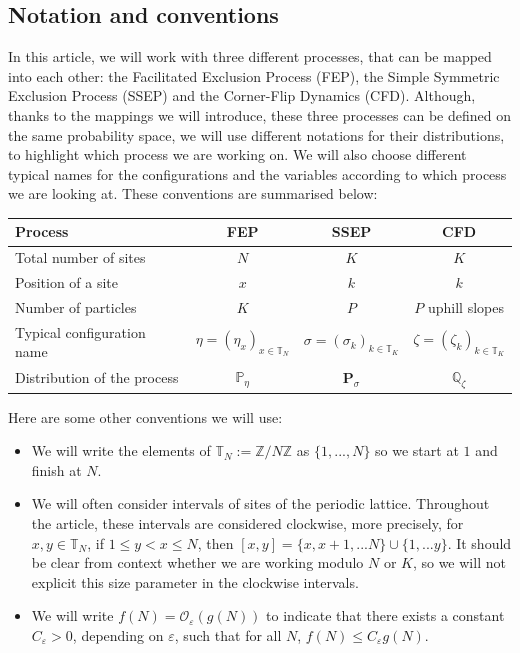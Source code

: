 \documentclass[11pt,a4paper]{article}
\newcommand{\Z}{\mathbb{Z}}
\newcommand{\T}{\mathbb{T}}
\newcommand{\PP}{\mathbb{P}}
\newcommand{\bP}{\textbf{P}}
\begin{document}
\subsection*{Notation and conventions}
In this article, we will work with three different processes, that can be mapped into each other: the Facilitated Exclusion Process (FEP), the Simple Symmetric Exclusion Process (SSEP) and the Corner-Flip Dynamics (CFD). Although, thanks to the mappings we will introduce, these three processes can be defined on the same probability space, we will use different notations for their distributions, to highlight which process we are working on. We will also choose different typical names for the configurations and the variables according to which process we are looking at. These conventions are summarised below:
\begin{center}
\def\arraystretch{1.4}%
\begin{tabular}{|l|c|c|c|}
\hline
Process & FEP & SSEP & CFD \\
\hline
Total number of sites &$N$ & $K$& $K$ \\
Position of a site & $x$ & $k$ & $k$ \\
Number of particles & $ K$ & $P$ & $P$ uphill slopes \\ 
Typical configuration name & $\eta=(\eta_x)_{x\in \T_N}$ & $\sigma=(\sigma_k)_{k\in\T_K} $ & $\zeta=(\zeta_k)_{k \in \T_K}$  \\
Distribution of the process  & ${\PP}_\eta$  & $\bP_\sigma$ & $\mathbb{Q}_\zeta$ \\
\hline
\end{tabular}
\end{center}
Here are some other conventions we will use:
\begin{itemize}
\item We will write the elements of $\T_N := \Z/N\Z$ as $\{1, ..., N\}$ so we start at $1$ and finish at $N$.
\item We will often consider intervals of sites of the periodic lattice. Throughout the article, these intervals are considered clockwise, more precisely, for $x,y\in \T_N$, if $1\le y < x \le N$, then $[x,y] = \{x, x+1, ... N\} \cup \{1, ... y\}$. It should be clear from context whether we are working modulo $N$ or $K$, so we will not explicit this size parameter in the clockwise intervals. 
\item We will write $f(N) = \mathcal{O}_{\varepsilon}\left(g(N)\right)$ to indicate that there exists a constant $C_\varepsilon >0$, depending on $\varepsilon$, such that for all $N$, $f(N) \le C_\varepsilon g(N)$.
\end{itemize}
\end{document}
